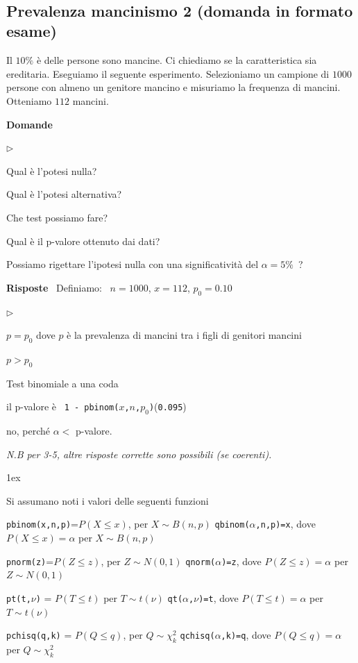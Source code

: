 \documentclass[11pt,openany]{book}
\newcommand{\mylabel}[1]{{\footnotesize\textsf{#1}}\hfill}
\renewenvironment{itemize}
  {\begin{list}{$\triangleright$}{%
   \setlength{\parskip}{0mm}
   \setlength{\topsep}{.2\baselineskip}
   \setlength{\rightmargin}{0mm}
   \setlength{\listparindent}{0mm}
   \setlength{\itemindent}{0mm}
   \setlength{\labelwidth}{3ex}
   \setlength{\itemsep}{.4\baselineskip}
   \setlength{\parsep}{0mm}
   \setlength{\partopsep}{0mm}
   \setlength{\labelsep}{1ex}
   \setlength{\leftmargin}{\labelwidth+\labelsep}
   \let\makelabel\mylabel}}{%
   \end{list}\vspace*{-1.3mm}}
\begin{document}
\hfill{}\clearpage\
\subsection{Prevalenza mancinismo 2 (domanda in formato esame)}

Il $10\%$ è delle persone sono mancine. Ci chiediamo se la caratteristica sia ereditaria. Eseguiamo il seguente esperimento. Selezioniamo un campione di $1000$ persone con almeno un genitore mancino e misuriamo la frequenza di mancini. Otteniamo $112$ mancini. 

\textbf{Domande}

\begin{itemize}
\item[1.] Qual è l'potesi nulla?

\item[2.] Qual è l'potesi alternativa?

\item[3.] Che test possiamo fare?

\item[4.] Qual è il p-valore ottenuto dai dati?

\item[5.] Possiamo rigettare l'ipotesi nulla con una significatività del $\alpha=5\%$~?
\end{itemize}

\textbf{Risposte} \ Definiamo: \ $n=1000$,\hfil
$x=112$,\hfil
$p_0=0.10$\hfil

\begin{itemize}
\item[1.] $p=p_0$ dove $p$ è la prevalenza di mancini tra i figli di genitori mancini
\item[2.]  $p>p_0$ 
\item[3.] Test binomiale a una coda
\item[4.] il p-valore è \ {\tt 1 - pbinom($x$,$n$,$p_0$)}\hfill ({\tt 0.095})
\item[5.] no, perché $\alpha<$ p-valore.
\end{itemize}


\textit{N.B per 3-5, altre risposte corrette sono possibili (se coerenti).}

\parskip1ex
{\hrulefill\scriptsize

Si assumano noti i valori delle seguenti funzioni

{\tt pbinom(x,n,p)}=$P(X\le x)$, per $X\sim B(n,p)$
\hfill 
{\tt qbinom($\alpha$,n,p)=x},  dove $P(X\le x)=\alpha$ per $X\sim B(n,p)$

{\tt pnorm(z)}=$P(Z\le z)$, per $Z\sim N(0,1)$
\hfill 
{\tt qnorm($\alpha$)=z},  dove $P(Z\le z)=\alpha$ per $Z\sim N(0,1)$

{\tt pt(t,$\nu$)} = $P(T\le t)$ per $T\sim t(\nu)$
\hfill
{\tt qt($\alpha$,$\nu$)=t}, dove $P(T\le t)=\alpha$ per $T\sim t(\nu)$

{\tt pchisq(q,k)} = $P(Q\le q)$, per $Q\sim \chi^2_k$
\hfill
{\tt qchisq($\alpha$,k)=q},  dove $P(Q\le q)=\alpha$ per $Q\sim \chi^2_k$
\par
}
\end{document}
